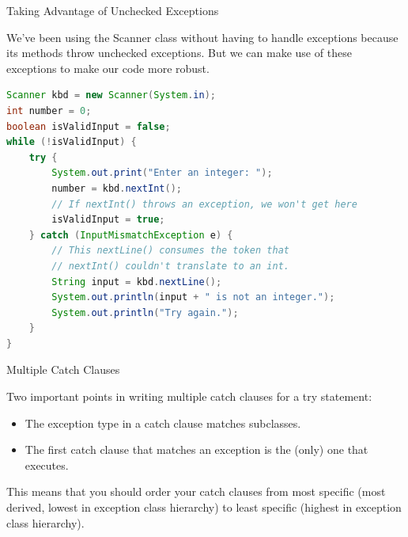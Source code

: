 \documentclass{beamer}
\begin{document}
\begin{frame}[fragile]{Taking Advantage of Unchecked Exceptions}


We've been using the Scanner class without having to handle exceptions because its methods throw unchecked exceptions.  But we can make use of these exceptions to make our code more robust.
\begin{lstlisting}[language=Java]
Scanner kbd = new Scanner(System.in);
int number = 0;
boolean isValidInput = false;
while (!isValidInput) {
    try {
        System.out.print("Enter an integer: ");
        number = kbd.nextInt();
        // If nextInt() throws an exception, we won't get here
        isValidInput = true;
    } catch (InputMismatchException e) {
        // This nextLine() consumes the token that
        // nextInt() couldn't translate to an int.
        String input = kbd.nextLine();
        System.out.println(input + " is not an integer.");
        System.out.println("Try again.");
    }
}
\end{lstlisting}


\end{frame}

\begin{frame}[fragile]{Multiple Catch Clauses}


Two important points in writing multiple catch clauses for a try statement:
\begin{itemize}
\item The exception type in a catch clause matches subclasses.
\item The first catch clause that matches an exception is the (only) one that executes.
\end{itemize}
This means that you should order your catch clauses from most specific (most derived, lowest in exception class hierarchy) to least specific (highest in exception class hierarchy).


\end{frame}
\end{document}
